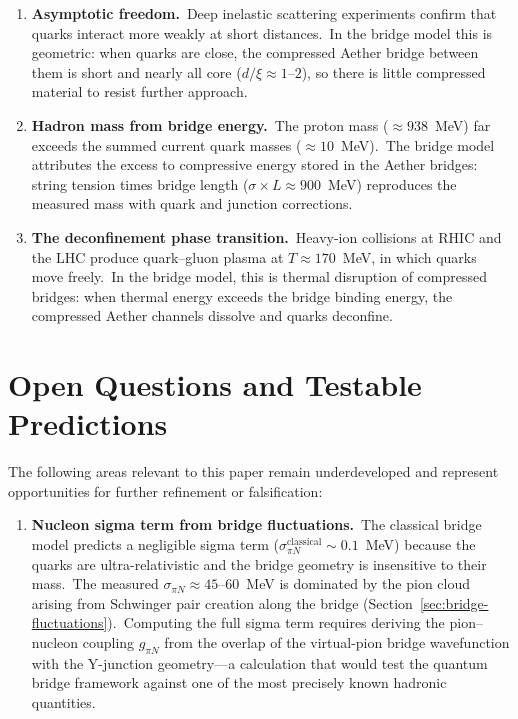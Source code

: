 ﻿\documentclass[12pt,letterpaper]{article}
\begin{document}
\begin{enumerate}[leftmargin=2em]
  \item \textbf{Asymptotic freedom.}\ Deep inelastic scattering experiments
    confirm that quarks interact more weakly at short distances.\ In the bridge
    model this is geometric: when quarks are close, the compressed Aether bridge
    between them is short and nearly all core ($d/\xi \approx 1$--$2$), so there
    is little compressed material to resist further approach.

  \item \textbf{Hadron mass from bridge energy.}\ The proton mass
    ($\approx 938$~MeV) far exceeds the summed current quark masses
    ($\approx 10$~MeV).\ The bridge model attributes the excess to
    compressive energy stored in the Aether bridges: string tension times bridge
    length ($\sigma \times L \approx 900$~MeV) reproduces the measured mass with
    quark and junction corrections.

  \item \textbf{The deconfinement phase transition.}\ Heavy-ion collisions at
    RHIC and the LHC produce quark--gluon plasma at $T \approx 170$~MeV, in
    which quarks move freely.\ In the bridge model, this is thermal disruption
    of compressed bridges: when thermal energy exceeds the bridge binding
    energy, the compressed Aether channels dissolve and quarks deconfine.

\end{enumerate}


\section{Open Questions and Testable Predictions}

The following areas relevant to this paper remain underdeveloped and represent opportunities for further refinement or falsification:

\begin{enumerate}[leftmargin=2em]
  \item \textbf{Nucleon sigma term from bridge fluctuations.}\ The classical
    bridge model predicts a negligible sigma term
    ($\sigma_{\pi N}^{\mathrm{classical}} \sim 0.1$~MeV) because the quarks
    are ultra-relativistic and the bridge geometry is insensitive to their
    mass.\ The measured $\sigma_{\pi N} \approx 45$--$60$~MeV
    \cite{alarcon2012,hoferichter2015} is dominated by the pion cloud
    arising from Schwinger pair creation along the bridge
    (Section~\ref{sec:bridge-fluctuations}).\ Computing the full sigma term
    requires deriving the pion--nucleon coupling $g_{\pi N}$ from the
    overlap of the virtual-pion bridge wavefunction with the Y-junction
    geometry---a calculation that would test the quantum bridge framework
    against one of the most precisely known hadronic quantities.

\end{enumerate}
\end{document}
